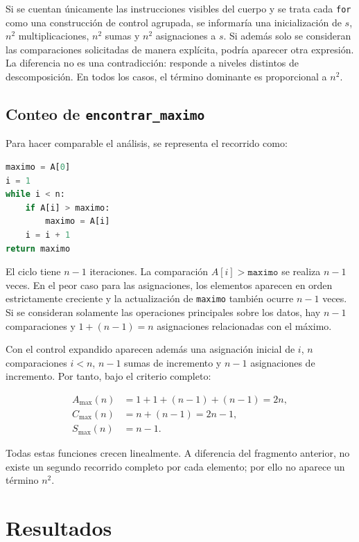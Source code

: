 \documentclass[12pt,letterpaper]{article}
\newcommand{\codigo}[1]{\texttt{#1}}
\begin{document}
Si se cuentan únicamente las instrucciones visibles del cuerpo y se trata cada \codigo{for} como una construcción de control agrupada, se informaría una inicialización de $s$, $n^2$ multiplicaciones, $n^2$ sumas y $n^2$ asignaciones a $s$. Si además solo se consideran las comparaciones solicitadas de manera explícita, podría aparecer otra expresión. La diferencia no es una contradicción: responde a niveles distintos de descomposición. En todos los casos, el término dominante es proporcional a $n^2$.

\subsection{Conteo de \codigo{encontrar\_maximo}}

Para hacer comparable el análisis, se representa el recorrido como:

\begin{lstlisting}[style=codigo,language=Python,caption={Búsqueda del máximo con control explícito}]
maximo = A[0]
i = 1
while i < n:
    if A[i] > maximo:
        maximo = A[i]
    i = i + 1
return maximo
\end{lstlisting}

El ciclo tiene $n-1$ iteraciones. La comparación $A[i]>\codigo{maximo}$ se realiza $n-1$ veces. En el peor caso para las asignaciones, los elementos aparecen en orden estrictamente creciente y la actualización de \codigo{maximo} también ocurre $n-1$ veces. Si se consideran solamente las operaciones principales sobre los datos, hay $n-1$ comparaciones y $1+(n-1)=n$ asignaciones relacionadas con el máximo.

Con el control expandido aparecen además una asignación inicial de $i$, $n$ comparaciones $i<n$, $n-1$ sumas de incremento y $n-1$ asignaciones de incremento. Por tanto, bajo el criterio completo:

\begin{align*}
A_{\max}(n)&=1+1+(n-1)+(n-1)=2n,\\
C_{\max}(n)&=n+(n-1)=2n-1,\\
S_{\max}(n)&=n-1.
\end{align*}

Todas estas funciones crecen linealmente. A diferencia del fragmento anterior, no existe un segundo recorrido completo por cada elemento; por ello no aparece un término $n^2$.

\section{Resultados}
\end{document}
